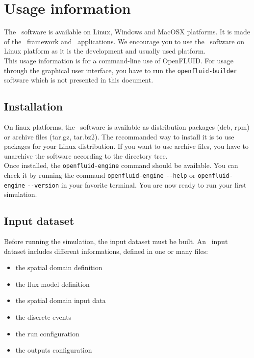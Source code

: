 \chapter{Usage information}

The \OFname \ software is available on Linux, Windows and MacOSX platforms.
It is made of the \OFname \ framework and \OFname \ applications. 
We encourage you to use the \OFname \ software on Linux platform as it is the
development and usually used platform.\\
This usage information is for a command-line use of OpenFLUID. For usage through
the graphical user interface, you have to run the \texttt{openfluid-builder} software 
which is not presented in this document.\\ 


\section{Installation}

On linux platforms, the \OFname \ software is available as distribution
packages (deb, rpm) or archive files (tar.gz, tar.bz2). The recommanded way to
install it is to use packages for your Linux distribution. If you want to use
archive files, you have to unarchive the software according to the directory tree.\\
Once installed, the \texttt{openfluid-engine} command should be available.
You can check it by running the command \texttt{openfluid-engine}
\verb?--?\texttt{help} or \texttt{openfluid-engine} \verb?--?\texttt{version}
in your favorite terminal. You are now ready to run your first simulation.

\section{Input dataset}

Before running the simulation, the input dataset must be built.
An \OFEname \ input dataset includes different informations, defined in one or
many files:
\begin{itemize}
  \item the spatial domain definition
  \item the flux model definition
  \item the spatial domain input data 
  \item the discrete events
  \item the run configuration
  \item the outputs configuration
\end{itemize}

